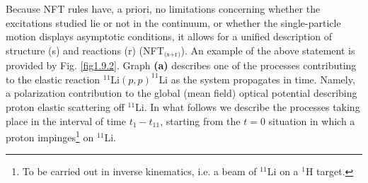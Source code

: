  Because NFT rules have, a priori,  no limitations concerning whether the excitations studied lie or not in the continuum, or whether the single-particle motion displays asymptotic conditions, it allows for a unified description of structure (s) and reactions (r) (NFT$_{\text{(s+r)}}$). An example of the above statement is provided by Fig. \ref{fig1.9.2}. Graph \textbf{(a)} describes  one of the processes contributing to the elastic
reaction $^{11}$Li$(p,p)^{11}$Li as the system propagates in time. Namely, a polarization contribution to
the global (mean field) optical potential describing proton elastic scattering off $^{11}$Li. 
In what follows we describe the processes taking place  in the interval of time $t_1-t_{11}$, starting from the $t=0$ situation in which a proton impinges\footnote{To be carried out in inverse kinematics, i.e. a beam of $^{11}$Li on a $^1$H target.} on $^{11}$Li.


